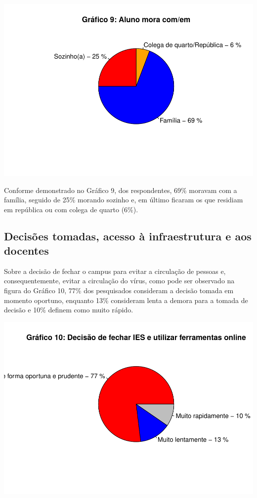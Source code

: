 \documentclass[
]{article}
\begin{document}
\includegraphics{consequencias-oriundas-da-pandemia-v1.0_files/figure-latex/grafico-9-1.pdf}

Conforme demonstrado no Gráfico 9, dos respondentes, 69\% moravam com a
família, seguido de 25\% morando sozinho e, em último ficaram os que
residiam em república ou com colega de quarto (6\%).

\hypertarget{decisuxf5es-tomadas-acesso-uxe0-infraestrutura-e-aos-docentes}{%
\subsection{Decisões tomadas, acesso à infraestrutura e aos
docentes}\label{decisuxf5es-tomadas-acesso-uxe0-infraestrutura-e-aos-docentes}}

Sobre a decisão de fechar o campus para evitar a circulação de pessoas
e, consequentemente, evitar a circulação do vírus, como pode ser
observado na figura do Gráfico 10, 77\% dos pesquisados consideram a
decisão tomada em momento oportuno, enquanto 13\% consideram lenta a
demora para a tomada de decisão e 10\% definem como muito rápido.

\includegraphics{consequencias-oriundas-da-pandemia-v1.0_files/figure-latex/grafico-10-1.pdf}
\end{document}

